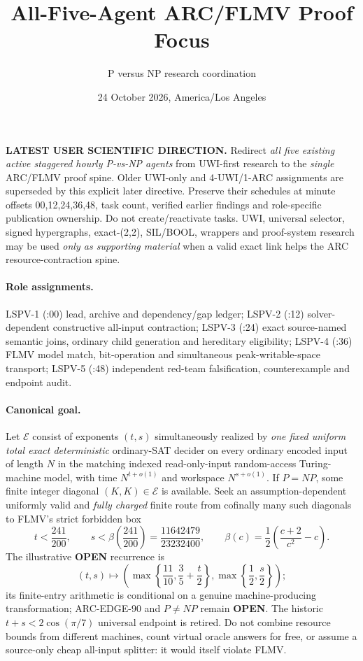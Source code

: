 \documentclass[11pt]{article}
\title{All-Five-Agent ARC/FLMV Proof Focus}
\author{P versus NP research coordination}
\date{24 October 2026, America/Los Angeles}
\begin{document}
\maketitle
\noindent\textbf{LATEST USER SCIENTIFIC DIRECTION.} Redirect \emph{all five existing active staggered hourly P-vs-NP agents} from UWI-first research to the \emph{single} ARC/FLMV proof spine. Older UWI-only and 4-UWI/1-ARC assignments are superseded by this explicit later directive. Preserve their schedules at minute offsets 00,12,24,36,48, task count, verified earlier findings and role-specific publication ownership. Do not create/reactivate tasks. UWI, universal selector, signed hypergraphs, exact-(2,2), SIL/BOOL, wrappers and proof-system research may be used \emph{only as supporting material} when a valid exact link helps the ARC resource-contraction spine.

\paragraph{Role assignments.}
LSPV-1 (:00) lead, archive and dependency/gap ledger;
LSPV-2 (:12) solver-dependent constructive all-input contraction;
LSPV-3 (:24) exact source-named semantic joins, ordinary child generation and hereditary eligibility;
LSPV-4 (:36) FLMV model match, bit-operation and simultaneous peak-writable-space transport;
LSPV-5 (:48) independent red-team falsification, counterexample and endpoint audit.

\paragraph{Canonical goal.}
Let $\mathcal E$ consist of exponents $(t,s)$ simultaneously realized by \emph{one fixed uniform total exact deterministic} ordinary-SAT decider on every ordinary encoded input of length $N$ in the matching indexed read-only-input random-access Turing-machine model, with time $N^{t+o(1)}$ and workspace $N^{s+o(1)}$. If $P=NP$, some finite integer diagonal $(K,K)\in\mathcal E$ is available. Seek an assumption-dependent uniformly valid and \emph{fully charged} finite route from cofinally many such diagonals to FLMV's strict forbidden box
\[
 t<\frac{241}{200},\qquad
 s<\beta\left(\frac{241}{200}\right)=\frac{11642479}{23232400},\qquad
 \beta(c)=\frac12\left(\frac{c+2}{c^2}-c\right).
\]
The illustrative \textbf{OPEN} recurrence is
\[
 (t,s)\longmapsto
 \left(\max\left\{\frac{11}{10},\frac35+\frac t2\right\},
 \max\left\{\frac12,\frac s2\right\}\right);
\]
its finite-entry arithmetic is conditional on a genuine machine-producing transformation; ARC-EDGE-90 and $P\ne NP$ remain \textbf{OPEN}. The historic $t+s<2\cos(\pi/7)$ universal endpoint is retired. Do not combine resource bounds from different machines, count virtual oracle answers for free, or assume a source-only cheap all-input splitter: it would itself violate FLMV.
\end{document}
